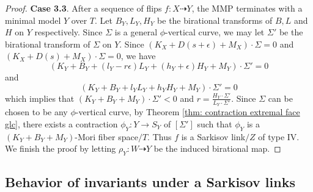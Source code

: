 \documentclass[11pt]{amsart}
\numberwithin{equation}{section}
\theoremstyle{definition}
\theoremstyle{definition}
\theoremstyle{definition}
\begin{document}
\begin{proof}
\medskip

\noindent\textbf{Case 3.3}. After a sequence of flips $f: X\dashrightarrow Y$, the MMP terminates with a minimal model $Y$ over $T$. Let $B_Y,L_Y,H_Y$ be the birational transforms of $B,L$ and $H$ on $Y$ respectively. Since $\Sigma$ is a general $\phi$-vertical curve, we may let $\Sigma'$ be the birational transform of $\Sigma$ on $Y$. Since $(K_{X}+D(s+\epsilon)+M_X)\cdot\Sigma=0$ and $(K_{X}+D(s)+M_X)\cdot\Sigma=0$, we have
$$(K_Y+B_Y+(l_Y-r\epsilon)L_Y+(h_Y+\epsilon)H_Y+M_Y)\cdot\Sigma'=0$$
and
$$(K_Y+B_Y+l_YL_Y+h_YH_Y+M_Y)\cdot\Sigma'=0$$
which implies that $(K_Y+B_Y+M_Y)\cdot\Sigma'<0$ and $r=\frac{H_Y\cdot\Sigma'}{L_Y\cdot\Sigma'}$. Since $\Sigma$ can be chosen to be any $\phi$-vertical curve, by Theorem \ref{thm: contraction extremal face glc}, there exists a contraction $\phi_Y:Y\rightarrow S_Y$ of $[\Sigma']$ such that $\phi_Y$ is a $(K_Y+B_Y+M_Y)$-Mori fiber space$/T$. Thus $f$ is a Sarkisov link$/Z$ of type IV.  We finish the proof by letting $\rho_Y: W\dashrightarrow Y$ be the induced birational map.
\end{proof}

\subsection{Behavior of invariants under a Sarkisov links}
\end{document}
